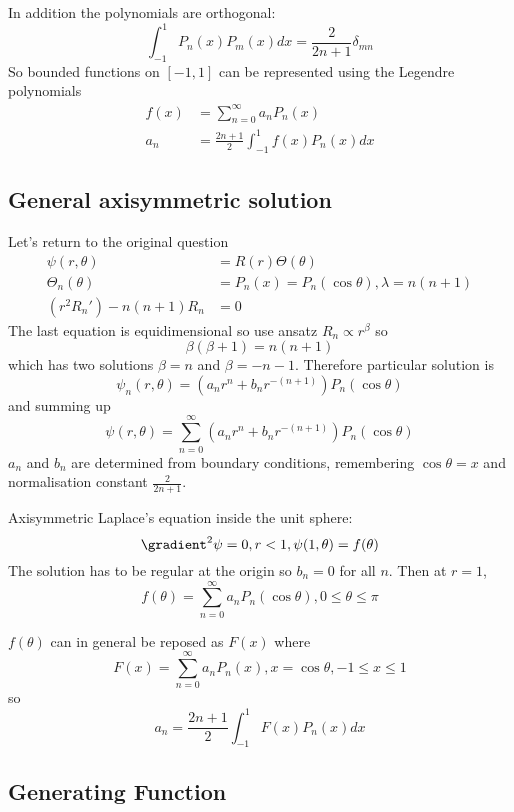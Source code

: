\documentclass[a4paper]{article}
\newcommand*\grad{\gradient}
\newcommand*\laplace{\grad^2}
\newcommand*\lap{\laplace}
\begin{document}
In addition the polynomials are orthogonal:
\[
  \int_{-1}^{1} P_n(x) P_m(x) dx = \frac{2}{2n + 1} \delta_{mn}
\]
So bounded functions on \([-1, 1]\) can be represented using the Legendre polynomials
\begin{align*}
  f(x) &= \sum_{n = 0}^{\infty} a_n P_n(x) \\
  a_n &=  \frac{2n + 1}{2} \int_{-1}^{1}  f(x) P_n(x) dx
\end{align*}

\subsection{General axisymmetric solution}

Let's return to the original question
\begin{align*}
  \psi(r, \theta) &= R(r) \Theta(\theta) \\
  \Theta_n(\theta) &= P_n(x) = P_n(\cos \theta), \lambda = n(n + 1) \\
  (r^2 R_n') - n(n + 1) R_n &= 0
\end{align*}
The last equation is equidimensional so use ansatz \(R_n \propto r^\beta\) so
\[
  \beta(\beta + 1) = n(n + 1)
\]
which has two solutions \(\beta = n\) and \(\beta = -n - 1\). Therefore particular solution is
\[
  \psi_n(r, \theta) = (a_nr^n + b_n r^{-(n + 1)}) P_n(\cos \theta)
\]
and summing up
\[
  \psi(r, \theta) = \sum_{n = 0}^{\infty} (a_nr^n + b_n r^{-(n + 1)}) P_n(\cos \theta)
\]
\(a_n\) and \(b_n\) are determined from boundary conditions, remembering \(\cos \theta = x\) and normalisation constant \(\frac{2}{2n +1}\).

\begin{eg}
  Axisymmetric Laplace's equation inside the unit sphere:
  \[
    \lap \psi = 0, r < 1, \psi(1, \theta) = f(\theta)
  \]
  The solution has to be regular at the origin so \(b_n = 0\) for all \(n\). Then at \(r = 1\),
  \[
    f(\theta) = \sum_{n = 0}^{\infty} a_n P_n(\cos \theta), 0 \leq \theta \leq \pi
  \]

  \(f(\theta)\) can in general be reposed as \(F(x)\) where
  \[
    F(x) = \sum_{n = 0}^{\infty} a_n P_n(x), x = \cos \theta, -1 \leq x \leq 1
  \]
  so
  \[
    a_ n = \frac{2n + 1}{2} \int_{-1}^{1} F(x) P_n(x) dx
  \]
\end{eg}

\subsection{Generating Function}
\end{document}
